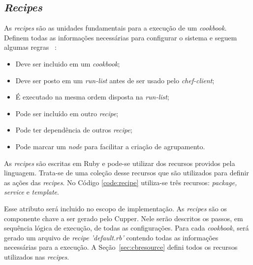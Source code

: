 
\subsection{\textit{Recipes}}
\label{sec:lev-rec-rec}

As \textit{recipes} são as unidades fundamentais para a execução de um \textit{cookbook}. Definem
todas as informações necessárias para configurar o sistema e seguem algumas regras
~\cite{chefdoc:2016}:

\begin{itemize}
  \item Deve ser incluido em um \textit{cookbook};
  \item Deve ser posto em um \textit{run-list} antes de ser usado pelo \textit{chef-client};
  \item É executado na mesma ordem disposta na \textit{run-list};
  \item Pode ser incluído em outro \textit{recipe};
  \item Pode ter dependência de outros \textit{recipe};
  \item Pode marcar um \textit{node} para facilitar a criação de agrupamento.
\end{itemize}

As \textit{recipes} são escritas em Ruby e pode-se utilizar dos recursos providos
pela linguagem. Trata-se de uma coleção desse recursos que são utilizados
para definir as ações das \textit{recipes}. No Código \ref{code:recipe} utiliza-se
três recursos: \textit{package, service} e \textit{template}.

\begin{minipage}{.90\textwidth}
  \lstset{style=shell}
  
\end{minipage}

Esse atributo será incluido no escopo de implementação. As \textit{recipes} são os componente chave a
ser gerado pelo Cupper. Nele serão descritos os passos, em sequência lógica de execução,
de todas as configurações. Para cada \textit{cookbook}, será gerado um arquivo de 
\textit{recipe 'default.rb'} contendo todas as informações necessárias para a execução.
A Seção~\ref{sec:cbresource} defini todos os recursos utilizados nas \textit{recipes}.
